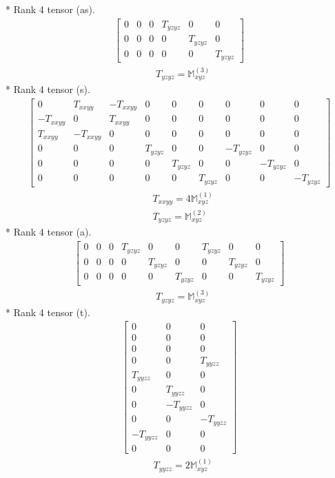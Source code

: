 \documentclass[fleqn,8pt,landscape]{jsarticle}
\begin{document}
* Rank 4 tensor (as).
\begin{align*}
\begin{bmatrix} 0 & 0 & 0 & T_{yzyz} & 0 & 0 \\ 0 & 0 & 0 & 0 & T_{yzyz} & 0 \\ 0 & 0 & 0 & 0 & 0 & T_{yzyz} \end{bmatrix}
\end{align*}
\begin{align*}
& T_{yzyz} = \mathbb{M}_{xyz}^{(3)}
\end{align*}
* Rank 4 tensor (s).
\begin{align*}
\begin{bmatrix} 0 & T_{xxyy} & - T_{xxyy} & 0 & 0 & 0 & 0 & 0 & 0 \\ - T_{xxyy} & 0 & T_{xxyy} & 0 & 0 & 0 & 0 & 0 & 0 \\ T_{xxyy} & - T_{xxyy} & 0 & 0 & 0 & 0 & 0 & 0 & 0 \\ 0 & 0 & 0 & T_{yzyz} & 0 & 0 & - T_{yzyz} & 0 & 0 \\ 0 & 0 & 0 & 0 & T_{yzyz} & 0 & 0 & - T_{yzyz} & 0 \\ 0 & 0 & 0 & 0 & 0 & T_{yzyz} & 0 & 0 & - T_{yzyz} \end{bmatrix}
\end{align*}
\begin{align*}
& T_{xxyy} = 4 \mathbb{M}_{xyz}^{(1)} \\
& T_{yzyz} = \mathbb{M}_{xyz}^{(2)}
\end{align*}
* Rank 4 tensor (a).
\begin{align*}
\begin{bmatrix} 0 & 0 & 0 & T_{yzyz} & 0 & 0 & T_{yzyz} & 0 & 0 \\ 0 & 0 & 0 & 0 & T_{yzyz} & 0 & 0 & T_{yzyz} & 0 \\ 0 & 0 & 0 & 0 & 0 & T_{yzyz} & 0 & 0 & T_{yzyz} \end{bmatrix}
\end{align*}
\begin{align*}
& T_{yzyz} = \mathbb{M}_{xyz}^{(3)}
\end{align*}
* Rank 4 tensor (t).
\begin{align*}
\begin{bmatrix} 0 & 0 & 0 \\ 0 & 0 & 0 \\ 0 & 0 & 0 \\ 0 & 0 & T_{yyzz} \\ T_{yyzz} & 0 & 0 \\ 0 & T_{yyzz} & 0 \\ 0 & - T_{yyzz} & 0 \\ 0 & 0 & - T_{yyzz} \\ - T_{yyzz} & 0 & 0 \\ 0 & 0 & 0 \end{bmatrix}
\end{align*}
\begin{align*}
& T_{yyzz} = 2 \mathbb{M}_{xyz}^{(1)}
\end{align*}
\end{document}
